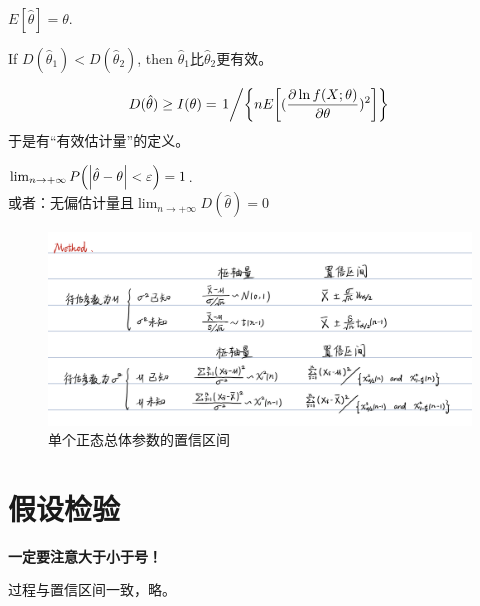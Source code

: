 \documentclass{article}
\begin{document}
\begin{defi}[无偏性]
	$E[\hat{\theta}]=\theta$.
\end{defi}

\begin{defi}[有效性]
	If $D(\hat{\theta}_1)<D(\hat{\theta}_2)$, then $\hat{\theta}_1$比$\hat{\theta}_2$更有效。
\end{defi}

\begin{thm}
    \[
		D(\hat{\theta})\ge I(\theta)=\flatfrac{1}{\qty{nE\qty[(\pdv{\ln f(X;\theta)}{\theta})^2]}}
    \] 
	于是有“有效估计量”的定义。
\end{thm}

\begin{defi}[一致估计量]
	$\lim_{n\to+\infty}P\qty(\abs{\hat{\theta}-\theta}<\varepsilon)=1$.
	\\[5pt]
	或者：无偏估计量且$\lim_{n\to+\infty}D(\hat{\theta})=0$
\end{defi}

\begin{figure}[H]
	\centering
	\includegraphics[width=0.82\linewidth]{N_confidence.png}
	\caption{单个正态总体参数的置信区间}
\end{figure}

\section{假设检验}
\begin{defi}[p值检验法]
    
\end{defi}
\textbf{\color{Red}一定要注意大于小于号！}

过程与置信区间一致，略。
\end{document}
